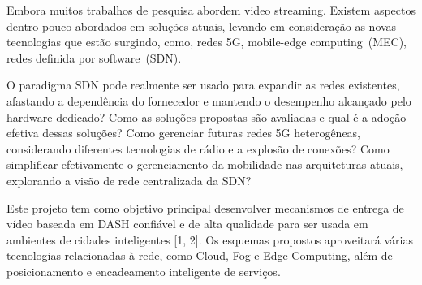 Embora muitos trabalhos de pesquisa abordem video streaming. Existem aspectos dentro pouco abordados em soluções atuais, levando em consideração as novas tecnologias que estão surgindo, como, redes 5G, mobile-edge computing~(MEC), redes definida por software~(SDN).

O paradigma SDN pode realmente ser usado para expandir as redes existentes, afastando a dependência do fornecedor e mantendo o desempenho alcançado pelo hardware dedicado? Como as soluções propostas são avaliadas e qual é a adoção efetiva dessas soluções? Como gerenciar futuras redes 5G heterogêneas, considerando diferentes tecnologias de rádio e a explosão de conexões? Como simplificar efetivamente o gerenciamento da mobilidade nas arquiteturas atuais, explorando a visão de rede centralizada da SDN?




 
Este projeto tem como objetivo principal desenvolver mecanismos de entrega de vídeo baseada em DASH confiável e de alta qualidade para ser usada em ambientes de cidades inteligentes [1, 2]. Os esquemas propostos aproveitará várias tecnologias relacionadas à rede, como Cloud, Fog e Edge Computing, além de posicionamento e encadeamento inteligente de serviços. %

